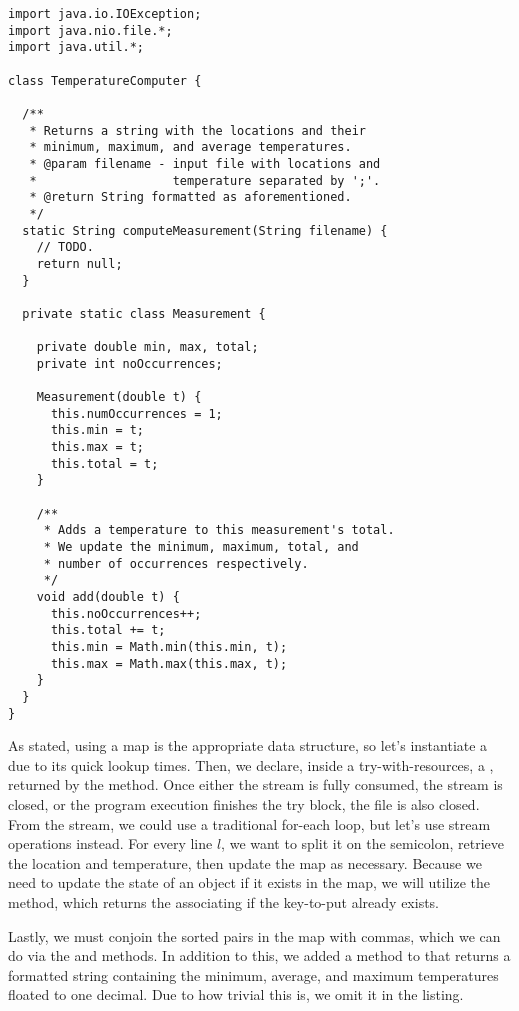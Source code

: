 \begin{lstlisting}[language=MyJava]
import java.io.IOException;
import java.nio.file.*;
import java.util.*;

class TemperatureComputer {
  
  /**
   * Returns a string with the locations and their 
   * minimum, maximum, and average temperatures.
   * @param filename - input file with locations and 
   *                   temperature separated by ';'.
   * @return String formatted as aforementioned.
   */
  static String computeMeasurement(String filename) {
    // TODO.
    return null;
  }

  private static class Measurement {
  
    private double min, max, total;
    private int noOccurrences;

    Measurement(double t) {
      this.numOccurrences = 1;
      this.min = t;
      this.max = t;
      this.total = t;
    }

    /**
     * Adds a temperature to this measurement's total.
     * We update the minimum, maximum, total, and 
     * number of occurrences respectively.
     */
    void add(double t) {
      this.noOccurrences++;
      this.total += t;
      this.min = Math.min(this.min, t);
      this.max = Math.max(this.max, t);
    }
  }
}
\end{lstlisting}

As stated, using a map is the appropriate data structure, so let's instantiate a  due to its quick lookup times. Then, we declare, inside a try-with-resources, a , returned by the  method. Once either the stream is fully consumed, the stream is closed, or the program execution finishes the try block, the file is also closed. From the stream, we could use a traditional for-each loop, but let's use stream operations instead. For every line $l$, we want to split it on the semicolon, retrieve the location and temperature, then update the map as necessary. Because we need to update the state of an object if it exists in the map, we will utilize the  method, which returns the associating  if the key-to-put already exists.

Lastly, we must conjoin the sorted pairs in the map with commas, which we can do via the  and  methods. In addition to this, we added a  method to  that returns a formatted string containing the minimum, average, and maximum temperatures floated to one decimal. Due to how trivial this is, we omit it in the listing.

